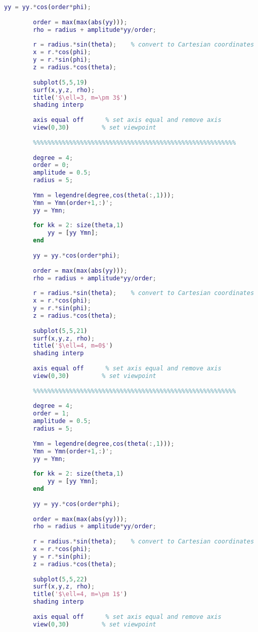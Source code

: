 \begin{lstlisting}[language=MATLAB]
		yy = yy.*cos(order*phi);
		
		order = max(max(abs(yy)));
		rho = radius + amplitude*yy/order;
		
		r = radius.*sin(theta);    % convert to Cartesian coordinates
		x = r.*cos(phi);
		y = r.*sin(phi);
		z = radius.*cos(theta);
		
		subplot(5,5,19)
		surf(x,y,z, rho);
		title('$\ell=3, m=\pm 3$')
		shading interp
		
		axis equal off      % set axis equal and remove axis
		view(0,30)         % set viewpoint
		
		%%%%%%%%%%%%%%%%%%%%%%%%%%%%%%%%%%%%%%%%%%%%%%%%%%%%%%%%
		
		degree = 4;
		order = 0;
		amplitude = 0.5;
		radius = 5;
		
		Ymn = legendre(degree,cos(theta(:,1)));
		Ymn = Ymn(order+1,:)';
		yy = Ymn;
		
		for kk = 2: size(theta,1)
		    yy = [yy Ymn];
		end
		
		yy = yy.*cos(order*phi);
		
		order = max(max(abs(yy)));
		rho = radius + amplitude*yy/order;
		
		r = radius.*sin(theta);    % convert to Cartesian coordinates
		x = r.*cos(phi);
		y = r.*sin(phi);
		z = radius.*cos(theta);
		
		subplot(5,5,21)
		surf(x,y,z, rho);
		title('$\ell=4, m=0$')
		shading interp
		
		axis equal off      % set axis equal and remove axis
		view(0,30)         % set viewpoint
		
		%%%%%%%%%%%%%%%%%%%%%%%%%%%%%%%%%%%%%%%%%%%%%%%%%%%%%%%%
		
		degree = 4;
		order = 1;
		amplitude = 0.5;
		radius = 5;
		
		Ymn = legendre(degree,cos(theta(:,1)));
		Ymn = Ymn(order+1,:)';
		yy = Ymn;
		
		for kk = 2: size(theta,1)
		    yy = [yy Ymn];
		end
		
		yy = yy.*cos(order*phi);
		
		order = max(max(abs(yy)));
		rho = radius + amplitude*yy/order;
		
		r = radius.*sin(theta);    % convert to Cartesian coordinates
		x = r.*cos(phi);
		y = r.*sin(phi);
		z = radius.*cos(theta);
		
		subplot(5,5,22)
		surf(x,y,z, rho);
		title('$\ell=4, m=\pm 1$')
		shading interp
		
		axis equal off      % set axis equal and remove axis
		view(0,30)         % set viewpoint
		

\end{lstlisting}
